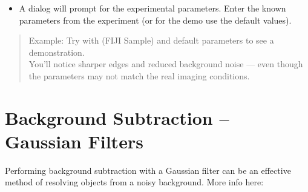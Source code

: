 \documentclass[letterpaper,10pt,english]{jupyterBook}
\begin{document}
\sphinxAtStartPar
{}
\begin{itemize}
\item {} 
\sphinxAtStartPar
A dialog will prompt for the experimental parameters. Enter the known parameters from the experiment
(or for the demo use the default values).

\end{itemize}

\sphinxAtStartPar
{}
\begin{quote}

\sphinxAtStartPar
Example: Try with  (FIJI Sample) and default parameters to see a demonstration.\\
You’ll notice sharper edges and reduced background noise — even though the parameters may not match the real imaging conditions.
\end{quote}

\sphinxAtStartPar
{}

\sphinxstepscope


\chapter{Background Subtraction – Gaussian Filters}
\label{\detokenize{background-subtraction:background-subtraction-gaussian-filters}}\label{\detokenize{background-subtraction::doc}}
\sphinxAtStartPar
Performing background subtraction with a Gaussian filter can be an effective method of resolving
objects from a noisy background. More info here:

\sphinxAtStartPar
{}
\end{document}
